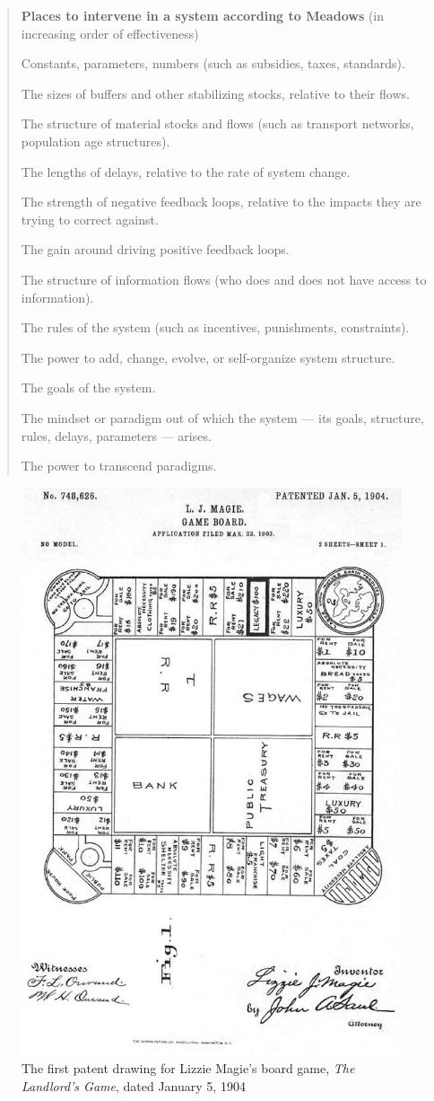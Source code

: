 \begin{quote}
\textbf{Places to intervene in a system according to Meadows}
(in increasing order of effectiveness)

\begin{etaremune} %
\item Constants, parameters, numbers (such as subsidies, taxes, standards).
\item The sizes of buffers and other stabilizing stocks, relative to their flows.
\item The structure of material stocks and flows (such as transport networks, population age structures).
\item The lengths of delays, relative to the rate of system change.
\item The strength of negative feedback loops, relative to the impacts they are trying to correct against.
\item The gain around driving positive feedback loops.
\item The structure of information flows (who does and does not have access to information).
\item The rules of the system (such as incentives, punishments, constraints).
\item The power to add, change, evolve, or self-organize system structure.
\item The goals of the system.
\item The mindset or paradigm out of which the system --- its goals, structure, rules, delays, parameters --- arises.
\item The power to transcend paradigms.
\end{etaremune}
\end{quote}

\begin{figure}[h]
 \centering
 \includegraphics[width=.5\textwidth]{pictures/landlords-game.eps}
 \caption{The first patent drawing for Lizzie Magie's board game, \emph{The Landlord's Game}, dated January 5, 1904}
 \label{fig:landlords-game}
\end{figure}

